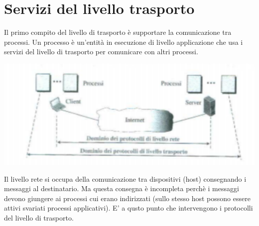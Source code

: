 \documentclass[12pt]{report}
\begin{document}
	\section{Servizi del livello trasporto}
	Il primo compito del livello di trasporto è supportare la comunicazione tra processi. Un processo è un'entità in esecuzione di livello applicazione che usa i servizi del livello di trasporto per comunicare con altri processi.
	\begin{center}
		\includegraphics[scale=0.5]{assets/trans-comm.png}
	\end{center}
	Il livello rete si occupa della comunicazione tra dispositivi (host) consegnando i messaggi al destinatario. Ma questa consegna è incompleta perchè i messaggi devono giungere ai processi cui erano indirizzati (sullo stesso host possono essere attivi svariati processi applicativi). E' a qusto punto che intervengono i protocolli del livello di trasporto.
\end{document}
